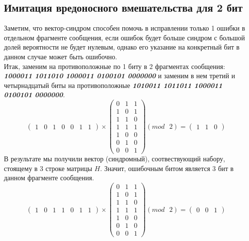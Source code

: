 \documentclass[a5paper, 10pt]{article}
\theoremstyle{definition}
\theoremstyle{plain}
\theoremstyle{remark}
\begin{document}
\subsection{Имитация вредоносного вмешательства для 2 бит}
Заметим, что вектор-синдром способен помочь в исправлении только 1 ошибки в отдельном фрагменте сообщения, если ошибок будет больше синдром с большой долей вероятности не будет нулевым, однако его указание на конкретный бит в данном случае может быть ошибочно.\\
Итак, заменим на противоположные по 1 биту в 2 фрагментах сообщения:\\
 \textbf{\textit{10\colorbox[rgb]{0.50, 0.5, 0.5}{0}0011 101101\colorbox[rgb]{0.50, 0.5, 0.5}{0} 1000011 0100101 0000000}} и заменим в нем третий и четырнадцатый биты на противоположные  \textbf{\textit{10\colorbox[rgb]{0.4, 0.8, 0.8}{1}0011 101101\colorbox[rgb]{0.4, 0.8, 0.8}{1} 1000011 0100101 0000000}}.\\
\begin{equation}
\begin{pmatrix}
1 & 0 & 1 & 0 & 0 & 1 & 1
\end{pmatrix}
 \times
\begin{pmatrix}
0 & 1 & 1\\
1 & 0 & 1\\
1 & 1 & 0\\
1 & 1 & 1 \\
1 & 0 & 0\\
0 & 1 & 0 \\
0 & 0 & 1
\end{pmatrix}
(mod \text{ }2)
= \begin{pmatrix}
1 & 1 & 0 
\end{pmatrix}
\end{equation}
В результате мы получили вектор (синдромный), соотвествующий набору, стоящему в 3 строке матрицы $H$. Значит, ошибочным битом является 3 бит в данном фрагменте сообщения.\\
\begin{equation}
\begin{pmatrix}
1 & 0 & 1 & 1 & 0 & 1 & 1
\end{pmatrix}
 \times
\begin{pmatrix}
0 & 1 & 1\\
1 & 0 & 1\\
1 & 1 & 0\\
1 & 1 & 1 \\
1 & 0 & 0\\
0 & 1 & 0 \\
0 & 0 & 1
\end{pmatrix}
(mod \text{ }2)
= \begin{pmatrix}
0 & 0 & 1 
\end{pmatrix}
\end{equation}
\end{document}
